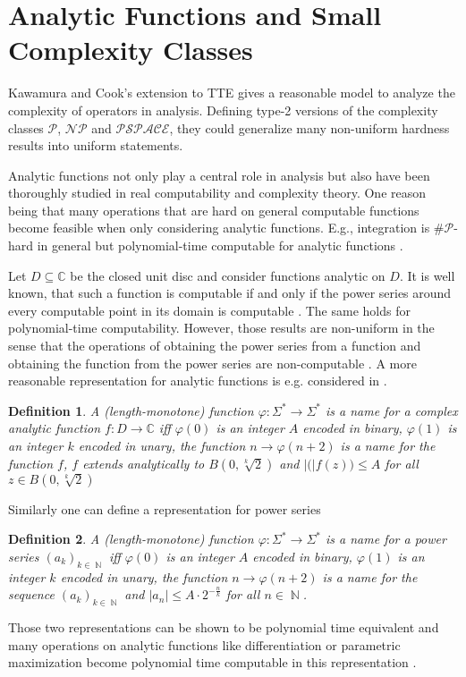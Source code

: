 \documentclass{article}
\newcommand{\CC}{\mathbb C}
\DeclareMathOperator{\NN}{\mathbb N}
\newcommand{\abs}[1]{\left|#1\right|}
\newcommand{\p}{\ensuremath{\mathcal P}\xspace}
\newcommand{\np}{\ensuremath{\mathcal{NP}}\xspace}
\newcommand{\sharpp}{\ensuremath{\# \mathcal{P}}\xspace}
\newcommand{\pspace}{\ensuremath{ \mathcal{PSPACE}}\xspace}
\newtheorem{definition}{Definition}
\begin{document}
\section*{Analytic Functions and Small Complexity Classes}
Kawamura and Cook's extension to TTE \cite{AkiACM} gives a reasonable model to  analyze the complexity of operators in analysis.
Defining type-2 versions of the complexity classes \p, \np and \pspace, they could generalize many non-uniform hardness results into uniform statements.

Analytic functions not only play a central role in analysis but also have been thoroughly studied in real computability and complexity theory.
One reason being that many operations that are hard on general computable functions become feasible when only considering analytic functions.
E.g., integration is \sharpp-hard in general \cite{MR748898,AkiACM} but polynomial-time computable for analytic functions \cite{MR1137517, Kawamura2012}.  

Let $D \subseteq \CC$ be the closed unit disc and consider functions analytic on $D$.
It is well known, that such a function is computable if and only if the power series around every computable point in its domain is computable \cite{MR1137517}.
The same holds for polynomial-time computability.
However, those results are non-uniform in the sense that the operations of obtaining the power series from a function and obtaining the function from the power series are non-computable \cite{Mueller95}.
A more reasonable representation for analytic functions is e.g. considered in \cite{Kawamura2012}.
\begin{definition}\label{def:function}
  A (length-monotone) function $\varphi: \Sigma^* \to \Sigma^*$ is a name for a complex analytic function $f:D \to \CC$ iff
  $\varphi(0)$ is an integer $A$ encoded in binary,
  $\varphi(1)$ is an integer $k$ encoded in unary,
  the function $n \to \varphi(n+2)$ is a name for the function $f$,
  $f$ extends analytically to $B(0, \sqrt[k]{2})$ and
  $\abs(f(z)) \leq A$ for all $z \in B(0, \sqrt[k]{2})$

\end{definition}
Similarly one can define a representation for power series 
\begin{definition}\label{def:powerseries}
  A (length-monotone) function $\varphi: \Sigma^* \to \Sigma^*$ is a name for a power series $(a_k)_{k \in \NN}$ iff
  $\varphi(0)$ is an integer $A$ encoded in binary,
  $\varphi(1)$ is an integer $k$ encoded in unary,
  the function $n \to \varphi(n+2)$ is a name for the sequence $(a_k)_{k \in \NN}$ and
  $\abs{a_n} \leq A \cdot 2^{-\frac{n}{k}}$ for all $n \in \NN$.
\end{definition}
Those two representations can be shown to be polynomial time equivalent  and many operations on analytic functions like differentiation or parametric maximization become polynomial time computable in this representation \cite{Kawamura2012}.
\end{document}
